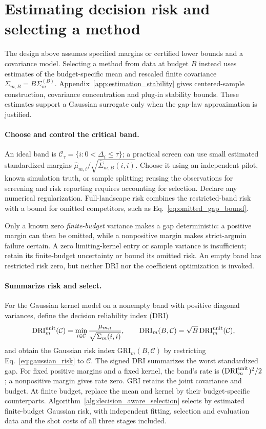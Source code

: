 \documentclass[a4paper,onecolumn,unpublished,nopdfoutputerror]{quantumarticle}
\theoremstyle{plain}
\theoremstyle{definition}
\newcommand{\calC}{\mathcal{C}}
\newcommand{\DRI}{\mathrm{DRI}}
\newcommand{\GRI}{\mathrm{GRI}}
\newcommand{\1}{\mathbf{1}}
\begin{document}
\section{Estimating decision risk and selecting a method}
\label{sec:estimating_decision_kernel}

The design above assumes specified margins or certified lower bounds and a covariance model. Selecting a method from data at budget $B$ instead uses estimates of the budget-specific mean and rescaled finite covariance $\Sigma_{m,B}=B\Sigma_m^{(B)}$. Appendix~\ref{app:estimation_stability} gives centered-sample construction, covariance concentration and plug-in stability bounds. These estimates support a Gaussian surrogate only when the gap-law approximation is justified.

\paragraph{Choose and control the critical band.}
An ideal band is $\calC_\tau=\{i:0<\Delta_i\le\tau\}$; a practical screen can use small estimated standardized margins $\widehat\mu_{m,i}/\sqrt{\widehat\Sigma_{m,B}(i,i)}$. Choose it using an independent pilot, known simulation truth, or sample splitting; reusing the observations for screening and risk reporting requires accounting for selection. Declare any numerical regularization. Full-landscape risk combines the restricted-band risk with a bound for omitted competitors, such as Eq.~\eqref{eq:omitted_gap_bound}.

Only a known zero \emph{finite-budget} variance makes a gap deterministic: a positive margin can then be omitted, while a nonpositive margin makes strict-argmin failure certain. A zero limiting-kernel entry or sample variance is insufficient; retain its finite-budget uncertainty or bound its omitted risk. An empty band has restricted risk zero, but neither DRI nor the coefficient optimization is invoked.

\paragraph{Summarize risk and select.}
For the Gaussian kernel model on a nonempty band with positive diagonal variances, define the decision reliability index (DRI)
\begin{equation}
\DRI_m^{\rm unit}(\calC)=\min_{i\in\calC}\frac{\mu_{m,i}}{\sqrt{\Sigma_m(i,i)}},
\qquad \DRI_m(B,\calC)=\sqrt B\,\DRI_m^{\rm unit}(\calC),
\end{equation}
and obtain the Gaussian risk index $\GRI_m(B,\calC)$ by restricting Eq.~\eqref{eq:gaussian_risk} to $\calC$. The signed DRI summarizes the worst standardized gap. For fixed positive margins and a fixed kernel, the band's rate is $(\DRI_m^{\rm unit})^2/2$; a nonpositive margin gives rate zero. GRI retains the joint covariance and budget. At finite budget, replace the mean and kernel by their budget-specific counterparts. Algorithm~\ref{alg:decision_aware_selection} selects by estimated finite-budget Gaussian risk, with independent fitting, selection and evaluation data and the shot costs of all three stages included.
\end{document}
